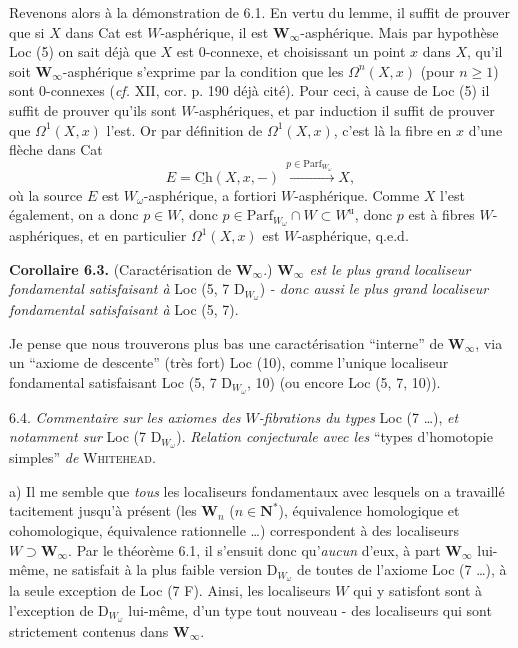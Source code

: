 \documentclass[11pt]{article}
\newcommand{\msp}[1]{\marginpar{\footnotesize [#1]}}
\begin{document}
Revenons alors à la démonstration de 6.1. En vertu du lemme, il suffit de prouver que si $X$ dans Cat est $W$-asphérique, il est $\mathbf{W}_\infty$-asphérique. Mais par hypothèse Loc (5) on sait déjà que $X$ est 0-connexe, et choisissant un point $x$ dans $X$, qu'il soit $\mathbf{W}_\infty$-asphérique s'exprime par la condition
\msp{page 85}
que les $\Omega^n(X,x)$ (pour $n \geq 1$) sont 0-connexes (\textit{cf.} XII, cor. p. 190 déjà cité). Pour ceci, à cause de Loc (5) il suffit de prouver qu'ils sont $W$-asphériques, et par induction il suffit de prouver que $\Omega^1(X,x)$ l'est. Or par définition de $\Omega^1(X,x)$, c'est là la fibre en $x$ d'une flèche dans Cat
\[ E = \underline{\mathrm{Ch}}(X,x,-) \xrightarrow{\ p \in \mathrm{Parf}_{W_\omega}\ } X, \]
où la source $E$ est $W_\omega$-asphérique, a fortiori $W$-asphérique. Comme $X$ l'est également, on a donc $p \in W$, donc $p \in \mathrm{Parf}_{W_\omega} \cap W \subset W^{\mathrm{u}}$, donc $p$ est à fibres $W$-asphériques, et en particulier $\Omega^1(X,x)$ est $W$-asphérique, q.e.d.

\textbf{Corollaire 6.3.} (Caractérisation de $\mathbf{W}_\infty$.) \textit{$\mathbf{W}_\infty$ est le plus grand localiseur fondamental satisfaisant à} Loc (5, 7 D$_{W_\omega}$) \textit{- donc aussi le plus grand localiseur fondamental satisfaisant à} Loc (5, 7).

Je pense que nous trouverons plus bas une caractérisation “interne” de $\mathbf{W}_\infty$, via un “axiome de descente” (très fort) Loc (10),
\msp{page 86}
comme l'unique localiseur fondamental satisfaisant Loc (5, 7 D$_{W_\omega}$, 10) (ou encore Loc (5, 7, 10)).

6.4. \textit{Commentaire sur les axiomes des $W$-fibrations du types} Loc (7 \ldots), \textit{et notamment sur} Loc (7 D$_{W_\omega}$). \textit{Relation conjecturale avec les} “types d'homotopie simples” \textit{de} \textsc{Whitehead}. %

a) Il me semble que \textit{tous} les localiseurs fondamentaux avec lesquels on a travaillé tacitement jusqu'à présent (les $\mathbf{W}_n$ ($n \in \mathbf{N}^*$), équivalence homologique et cohomologique, équivalence rationnelle \ldots) correspondent à des localiseurs $W \supset \mathbf{W}_\infty$. Par le théorème 6.1, il s'ensuit donc qu'\textit{aucun} d'eux, à part $\mathbf{W}_\infty$ lui-même, ne satisfait à la plus faible version D$_{W_\omega}$ de toutes de l'axiome Loc (7 \ldots), à la seule exception de Loc (7 F). Ainsi, les localiseurs $W$ qui y satisfont sont à l'exception de D$_{W_\omega}$ lui-même, d'un type tout nouveau - des localiseurs qui sont strictement contenus dans $\mathbf{W}_\infty$.
\end{document}
